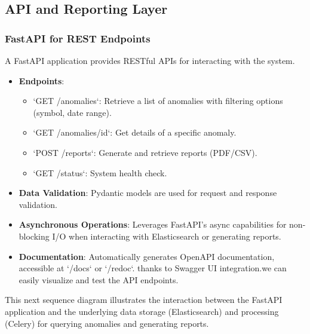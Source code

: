 \break





\subsection{API and Reporting Layer}

\subsubsection{FastAPI for REST Endpoints}

A FastAPI application provides RESTful APIs for interacting with the system.
\begin{itemize}
    \item \textbf{Endpoints}:
        \begin{itemize}
            \item `GET /anomalies`: Retrieve a list of anomalies with filtering options (symbol, date range).
            \item `GET /anomalies/{id}`: Get details of a specific anomaly.
            \item `POST /reports`: Generate and retrieve reports (PDF/CSV).
            \item `GET /status`: System health check.
        \end{itemize}
    \item \textbf{Data Validation}: Pydantic models are used for request and response validation.
    \item \textbf{Asynchronous Operations}: Leverages FastAPI's async capabilities for non-blocking I/O when interacting with Elasticsearch or generating reports.
    \item \textbf{Documentation}: Automatically generates OpenAPI documentation, accessible at `/docs` or `/redoc`. thanks to Swagger UI integration.we can easily visualize and test the API endpoints.
\end{itemize}



This next sequence diagram illustrates the interaction between the FastAPI application and the underlying data storage (Elasticsearch) and processing (Celery) for querying anomalies and generating reports.



